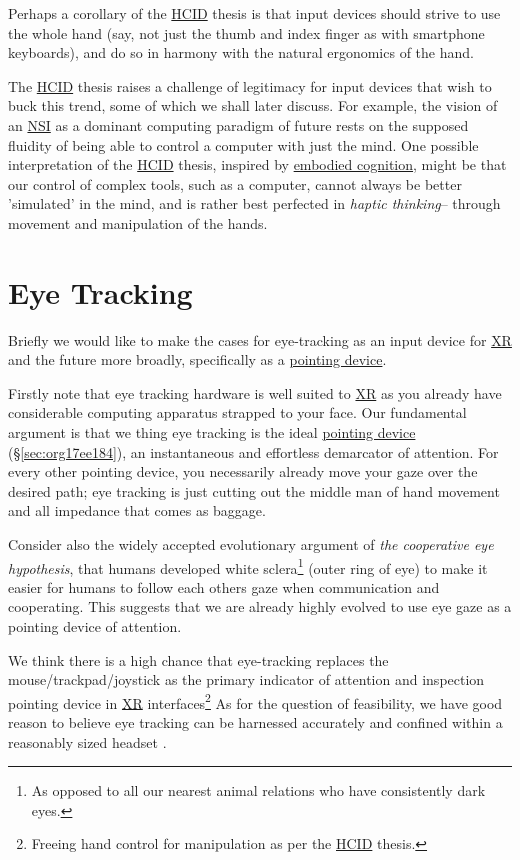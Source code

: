 \documentclass[logo,bsc,singlespacing,parskip]{infthesis}
\begin{document}
Perhaps a corollary of the \hyperref[org917851e]{HCID} thesis is that input devices should strive to use the whole hand (say, not just the thumb and index finger as with smartphone keyboards), and do so in harmony with the natural ergonomics of the hand.

The \hyperref[org917851e]{HCID} thesis raises a challenge of legitimacy for input devices that wish to buck this trend, some of which we shall later discuss.
For example, the vision of an \hyperref[orgbcfe20a]{NSI} as a dominant computing paradigm of future rests on the supposed fluidity of being able to control a computer with just the mind.
One possible interpretation of the \hyperref[org917851e]{HCID} thesis, inspired by \hyperref[org80caeb7]{embodied cognition}, might be that our control of complex tools, such as a computer, cannot always be better 'simulated' in the mind, and is rather best perfected in \emph{haptic thinking}-- through movement and manipulation of the hands.

\section{Eye Tracking}
\label{sec:org5b21f62}
Briefly we would like to make the cases for eye-tracking as an input device for \hyperref[org53dbe83]{XR} and the future more broadly, specifically as a \hyperref[pointing device]{pointing device}.

Firstly note that eye tracking hardware is well suited to \hyperref[org53dbe83]{XR} as you already have considerable computing apparatus strapped to your face.
Our fundamental argument is that we thing eye tracking is the ideal \hyperref[sec:org17ee184]{pointing device} (\S \ref{sec:org17ee184}), an instantaneous and effortless demarcator of attention.
For every other pointing device, you necessarily already move your gaze over the desired path; eye tracking is just cutting out the middle man of hand movement and all impedance that comes as baggage.

Consider also the widely accepted evolutionary argument of \emph{the cooperative eye hypothesis}, that humans developed white sclera\footnote{As opposed to all our nearest animal relations who have consistently dark eyes.} (outer ring of eye) to make it easier for humans to follow each others gaze when communication and cooperating.
This suggests that we are already highly evolved to use eye gaze as a pointing device of attention.

We think there is a high chance that eye-tracking replaces the mouse/trackpad/joystick as the primary indicator of attention and inspection pointing device in \hyperref[org53dbe83]{XR} interfaces\footnote{Freeing hand control for manipulation as per the \hyperref[org917851e]{HCID} thesis.}
As for the question of feasibility, we have good reason to believe eye tracking can be harnessed accurately \autocites{PrecisionGazeMouse}[][]{TobiiGamingNext} and confined within a reasonably sized headset \autocite{VIVEProEye}.
\end{document}
